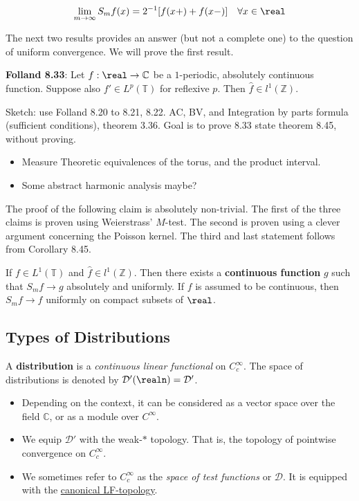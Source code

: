\[
\lim_{m\to\infty} S_m f(x) = 2^{-1}[f(x+) + f(x-)]\quad\forall x\in \real
\]

The next two results provides an answer (but not a complete one) to the
question of uniform convergence. We will prove the first result.

\textbf{Folland 8.33}: Let \(f:\real\to\mathbb{C}\) be a \(1\)-periodic,
absolutely continuous function. Suppose also \(f'\in L^p(\mathbb{T})\)
for reflexive \(p\). Then \(\hat{f}\in l^1(\mathbb{Z})\).

Sketch: use Folland 8.20 to 8.21, 8.22. AC, BV, and Integration by parts
formula (sufficient conditions), theorem 3.36. Goal is to prove 8.33
state theorem 8.45, without proving.

\begin{itemize}
\tightlist
\item
  Measure Theoretic equivalences of the torus, and the product interval.
\item
  Some abstract harmonic analysis maybe?
\end{itemize}

The proof of the following claim is absolutely non-trivial. The first of
the three claims is proven using Weierstrass' \(M\)-test. The second is
proven using a clever argument concerning the Poisson kernel. The third
and last statement follows from Corollary 8.45.

If \(f\in L^1(\mathbb{T})\) and \(\hat{f}\in l^1(\mathbb{Z})\). Then
there exists a \textbf{continuous function} \(g\) such that
\(S_m f\to g\) absolutely and uniformly. If \(f\) is assumed to be
continuous, then \(S_m f\to f\) uniformly on compact subsets of
\(\real\).

\hypertarget{types-of-distributions}{%
\subsection{Types of Distributions}\label{types-of-distributions}}

A \textbf{distribution} is a \emph{continuous linear functional} on
\(C_c^\infty\). The space of distributions is denoted by
\(\mathcal{D}'(\realn) = \mathcal{D}'\).

\begin{itemize}
\tightlist
\item
  Depending on the context, it can be considered as a vector space over
  the field \(\mathbb{C}\), or as a module over \(C^\infty\).
\item
  We equip \(\mathcal{D}'\) with the weak-\(\ast\) topology. That is,
  the topology of pointwise convergence on \(C_c^\infty\).
\item
  We sometimes refer to \(C_c^\infty\) as the \emph{space of test
  functions} or \(\mathcal{D}\). It is equipped with the
  \href{https://en.wikipedia.org/wiki/LF-space}{canonical LF-topology}.
\end{itemize}

